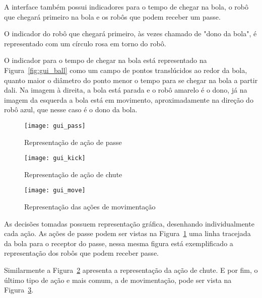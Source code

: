 A interface também possui indicadores para o tempo de chegar na bola, o robô que
chegará primeiro na bola e os robôs que podem receber um passe.

O indicador do robô que chegará primeiro, às vezes chamado de "dono da bola", é
representado com um círculo rosa em torno do robô.

O indicador para o tempo de chegar na bola está representado na
Figura~\ref{fig:gui_ball} como um campo de pontos translúcidos ao redor da bola,
quanto maior o diâmetro do ponto menor o tempo para se chegar na bola a partir dali.
Na imagem à direita, a bola está parada e o robô amarelo é o dono, já na imagem
da esquerda a bola está em movimento, aproximadamente na direção do robô azul,
que nesse caso é o dono da bola.


\begin{figure}[h]
  \centering
  \texttt{[image: gui\_pass]}
  \caption{Representação de ação de passe}\label{fig:gui_pass}
\end{figure}

\begin{figure}[h]
  \centering
  \texttt{[image: gui\_kick]}
  \caption{Representação de ação de chute}\label{fig:gui_kick}
\end{figure}

\begin{figure}[h]
  \centering
  \texttt{[image: gui\_move]}
  \caption{Representação das ações de movimentação}\label{fig:gui_move}
\end{figure}

As decisões tomadas possuem representação gráfica, desenhando individualmente
cada ação.  As ações de passe podem ser vistas na Figura~\ref{fig:gui_pass} uma
linha tracejada da bola para o receptor do passe, nessa mesma figura está
exemplificado a representação dos robôs que podem receber passe.

Similarmente a Figura~\ref{fig:gui_kick} apresenta a representação da ação de
chute.  E por fim, o último tipo de ação e mais comum, a de movimentação, pode
ser vista na Figura~\ref{fig:gui_move}.

\FloatBarrier

